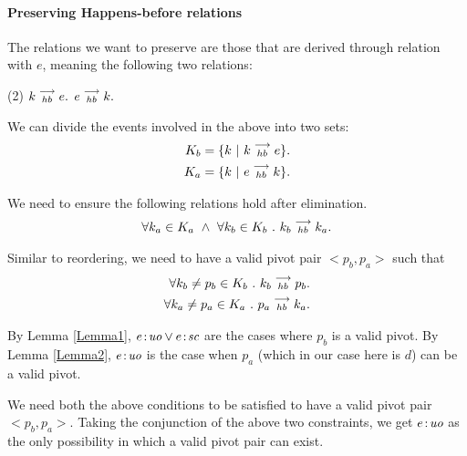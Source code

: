 \paragraph{Preserving Happens-before relations}
        
    The relations we want to preserve are those that are derived through relation with $e$, meaning the following two relations:
    \begin{tasks}(2)
        \task $k\stackrel{\longrightarrow}{_{hb}}e.$
        \task $e\stackrel{\longrightarrow}{_{hb}}k.$
    \end{tasks}

    We can divide the events involved in the above into two sets:
    \begin{align*}
        K_b = \{k \ | \ k\stackrel{\longrightarrow}{_{hb}}e \}. \\
        K_a = \{k \ | \ e\stackrel{\longrightarrow}{_{hb}}k \}. 
    \end{align*}
   
    We need to ensure the following relations hold after elimination.
    \begin{align}
        \forall k_a \in K_a \ \wedge \ \forall k_b \in K_b \ . \ \reln{k_b}{hb}{k_a}.
    \end{align}
    
    Similar to reordering, we need to have a valid pivot pair $<p_b, p_a>$ such that 
    \begin{align}
        \forall k_b \neq p_b \in K_b \ . \ k_b\stackrel{\longrightarrow}{_{hb}}p_b. \\
        \forall k_a \neq p_a \in K_a \ . \ p_a\stackrel{\longrightarrow}{_{hb}}k_a. 
    \end{align}

    By Lemma \ref{Lemma1}, $e\!:\!\textit{uo} \vee e\!:\!\textit{sc}$ are the cases where $p_b$ is a valid pivot. 
    By Lemma \ref{Lemma2}, $e\!:\!\textit{uo}$ is the case when $p_a$ (which in our case here is $d$) can be a valid pivot. 
    
    We need both the above conditions to be satisfied to have a valid pivot pair $<p_b, p_a>$. 
    Taking the conjunction of the above two constraints, we get $e\!:\!\textit{uo}$ as the only possibility in which a valid pivot pair can exist. 
    